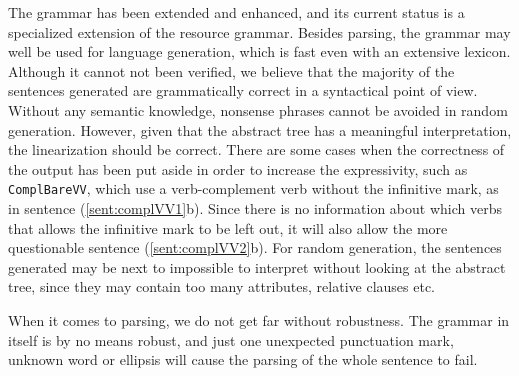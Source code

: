 \documentclass{report}
\begin{document}
The grammar has been extended and enhanced, and its current status is
a specialized extension of the resource grammar.
Besides parsing, the grammar may well be used for language generation,
which is fast even with an extensive lexicon.
Although it cannot not been verified, we believe that the majority of the
sentences generated are grammatically correct in a syntactical point of view.
Without any semantic knowledge, nonsense phrases cannot be avoided in
random generation. However, given that the abstract tree has a meaningful
interpretation,
the linearization should be correct. There are some cases when the correctness
of the output has been put aside in order to increase the expressivity, such
as \verb-ComplBareVV-, which use a verb-complement verb without the infinitive mark, 
as in sentence (\ref{sent:complVV1}b).
\label{sent:complVV1}
Since there is no information about which verbs that allows the infinitive mark
to be left out, it will also allow the more questionable sentence (\ref{sent:complVV2}b).
\label{sent:complVV2}
For random generation, the sentences generated may be next to impossible
to interpret without looking at the abstract tree, since they may contain
too many attributes, relative clauses etc. 

When it comes to parsing, we do not get far without robustness.
The grammar in itself is by no means robust, and just one 
unexpected punctuation mark, unknown word
or ellipsis will cause the parsing of the whole sentence to fail. 
\end{document}

